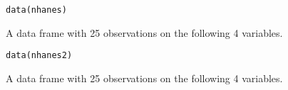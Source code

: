 \documentclass{article}
\begin{document}
\begin{Description}\relax
\end{Description}
\begin{Usage}
\begin{verbatim}data(nhanes)\end{verbatim}
\end{Usage}
\begin{Format}\relax
A data frame with 25 observations on the following 4 variables.
\end{Format}
\begin{Source}\relax
\end{Source}

\begin{Description}\relax
\end{Description}
\begin{Usage}
\begin{verbatim}data(nhanes2)\end{verbatim}
\end{Usage}
\begin{Format}\relax
A data frame with 25 observations on the following 4 variables.
\end{Format}
\begin{Source}\relax
\end{Source}
\end{document}
